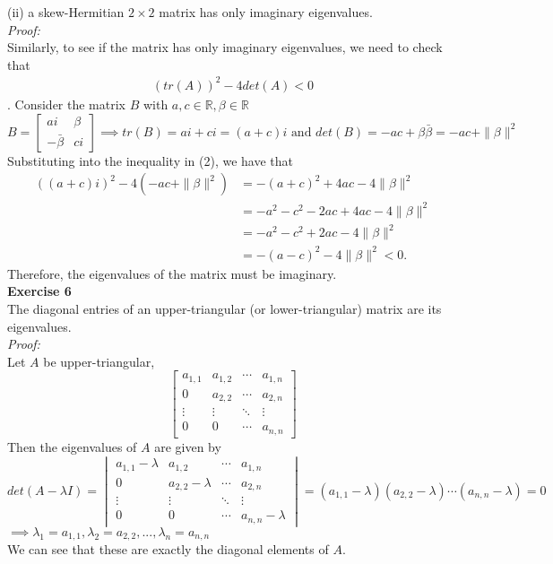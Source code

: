 \documentclass[letterpaper,12pt]{article}
\theoremstyle{definition}
\begin{document}
(ii) a skew-Hermitian $2 \times 2$ matrix has only imaginary eigenvalues. \\
\textit{Proof:} \\
Similarly, to see if the matrix has only imaginary eigenvalues, we need to check that
\begin{align}
  (tr(A))^2 - 4 det(A) < 0
\end{align}.
Consider the matrix $B$ with $a, c \in \mathbb{R}, \beta \in \mathbb{R}$
\[ B =
\begin{bmatrix}
  ai & \beta \\
  -\bar{\beta} & ci
\end{bmatrix}
\implies tr(B) = ai + ci = (a + c)i
\text{ and } det(B) = -ac + \beta\bar{\beta} = -ac + \|\beta\|^2
\]
Substituting into the inequality in (2), we have that
\begin{align*}
  ((a + c)i)^2 - 4(-ac + \|\beta\|^2)
  &= -(a + c)^2 + 4ac - 4\|\beta\|^2 \\
  &= -a^2 - c^2 - 2ac + 4ac - 4\|\beta\|^2 \\
  &= -a^2 - c^2 + 2ac - 4\|\beta\|^2 \\
  &= -(a - c)^2 - 4\|\beta\|^2 < 0.
\end{align*}
Therefore, the eigenvalues of the matrix must be imaginary. \\

\textbf{Exercise 6} \\
The diagonal entries of an upper-triangular (or lower-triangular) matrix are its eigenvalues. \\
\textit{Proof:} \\
Let $A$ be upper-triangular,
\[
\begin{bmatrix}
  a_{1,1} & a_{1,2} & \cdots & a_{1,n} \\
  0 & a_{2,2} & \cdots & a_{2,n} \\
  \vdots & \vdots & \ddots & \vdots \\
  0 & 0 & \cdots & a_{n,n}
\end{bmatrix}
\]
Then the eigenvalues of $A$ are given by
\[ det(A - \lambda I) =
\begin{vmatrix}
  a_{1,1} - \lambda & a_{1,2} & \cdots & a_{1,n} \\
  0 & a_{2,2} - \lambda & \cdots & a_{2,n} \\
  \vdots & \vdots & \ddots & \vdots \\
  0 & 0 & \cdots & a_{n,n} - \lambda
\end{vmatrix}
= (a_{1,1} - \lambda)(a_{2,2} - \lambda)\cdots(a_{n,n} - \lambda) = 0
\]
$\implies \lambda_1 = a_{1,1}, \lambda_2 = a_{2,2}, ..., \lambda_n = a_{n,n}$ \\
We can see that these are exactly the diagonal elements of $A$. \\
\end{document}
